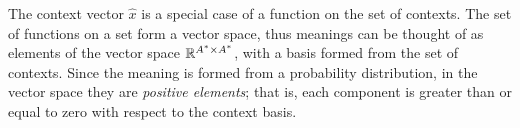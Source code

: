 \documentclass[12pt]{report}
\newcommand{\Cont}{\mathrm{Cont}}
\begin{document}

The context vector $\hat{x}$ is a special case of a function on the set of contexts. The set of functions on a set form a vector space, thus meanings can be thought of as elements of the vector space $\mathbb{R}^{A^* \times A^*}$, with a basis formed from the set of contexts. Since the meaning is formed from a probability distribution, in the vector space they are \emph{positive elements}; that is, each component is greater than or equal to zero with respect to the context basis.



\end{document}
